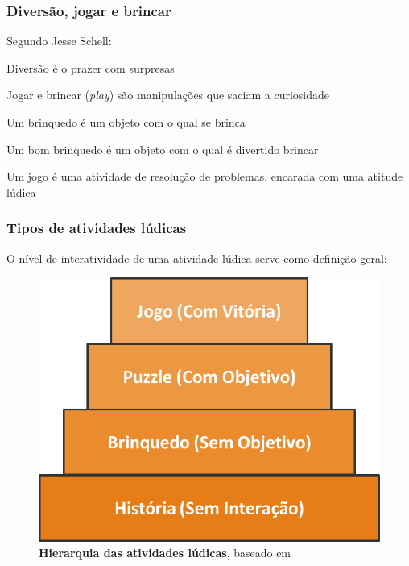 \expandafter\documentclass\expandafter[table, usenames, svgnames, dvipsnames, \classopts]{beamer}
\begin{document}
\begin{frame}
	\frametitle{\textbf{Diversão, jogar e brincar}}

	Segundo Jesse Schell:

	\vspace{1em}

	\begin{outline}
		\1 Diversão é o prazer com surpresas
	    
		\vspace{1em}
	    
		\1 Jogar e brincar (\textit{play}) são manipulações que saciam a curiosidade
		
		\vspace{1em}
			    
		\1 Um brinquedo é um objeto com o qual se brinca

		\vspace{1em}
			    
		\1 Um bom brinquedo é um objeto com o qual é divertido brincar

		\vspace{1em}
			    
		\1 Um jogo é uma atividade de resolução de problemas, encarada com uma atitude lúdica
			
	\end{outline}

\end{frame}

\begin{frame} 
	\frametitle{\textbf{Tipos de atividades lúdicas}}

	O nível de interatividade de uma atividade lúdica serve como definição geral:
    \begin{figure}
	    \centering
   		\includegraphics[height=0.5\paperheight]{types-of-play}
        \caption{\textbf{Hierarquia das atividades lúdicas}, baseado em \cite{Fullerton2008}}
    \end{figure}

\end{frame}
\end{document}
